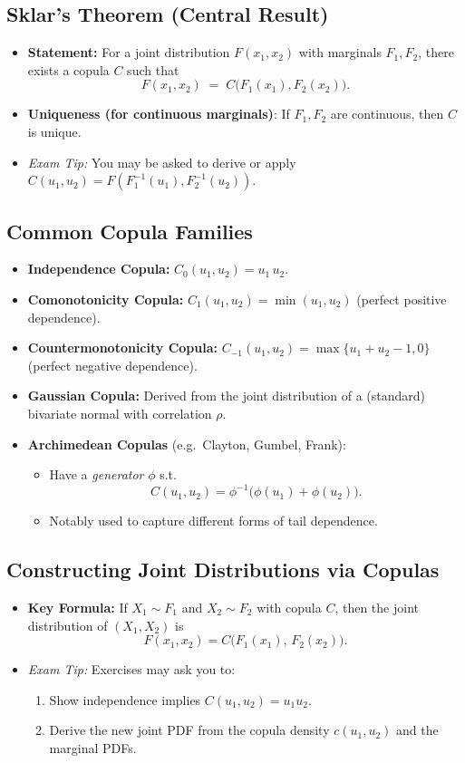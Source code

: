 \documentclass[13pt,a4paper]{article}
\begin{document}
\subsection{Sklar's Theorem (Central Result)}
\begin{itemize}
  \item \textbf{Statement:} For a joint distribution \(F(x_1,x_2)\) with marginals \(F_1,F_2\), there exists a copula \(C\) such that
  \[
    F(x_1,x_2) \;=\; C\bigl(F_1(x_1), F_2(x_2)\bigr).
  \]
  \item \textbf{Uniqueness (for continuous marginals)}: If \(F_1, F_2\) are continuous, then \(C\) is unique.
  \item \emph{Exam Tip:} You may be asked to derive or apply \(C(u_1,u_2)=F(F_1^{-1}(u_1),F_2^{-1}(u_2))\).  
\end{itemize}

\subsection{Common Copula Families}
\begin{itemize}
  \item \textbf{Independence Copula:} \(C_0(u_1,u_2)=u_1 \,u_2.\)
  \item \textbf{Comonotonicity Copula:} \(C_1(u_1,u_2)=\min(u_1,u_2)\) (perfect positive dependence).
  \item \textbf{Countermonotonicity Copula:} \(C_{-1}(u_1,u_2)=\max\{u_1+u_2-1,0\}\) (perfect negative dependence).
  \item \textbf{Gaussian Copula:} Derived from the joint distribution of a (standard) bivariate normal with correlation \(\rho\).
  \item \textbf{Archimedean Copulas} (e.g.\ Clayton, Gumbel, Frank): 
    \begin{itemize}
      \item Have a \emph{generator} \(\phi\) s.t.\ 
      \[
        C(u_1,u_2)=\phi^{-1}\bigl(\phi(u_1)+\phi(u_2)\bigr).
      \]
      \item Notably used to capture different forms of tail dependence.
    \end{itemize}
\end{itemize}

\subsection{Constructing Joint Distributions via Copulas}
\begin{itemize}
  \item \textbf{Key Formula:} If \(X_1\sim F_1\) and \(X_2\sim F_2\) with copula \(C\), then the joint distribution of \((X_1,X_2)\) is
  \[
    F(x_1,x_2) = C\bigl(F_1(x_1),\, F_2(x_2)\bigr).
  \]
  \item \emph{Exam Tip:} Exercises may ask you to:
    \begin{enumerate}
      \item Show independence implies \(C(u_1,u_2)=u_1u_2\).
      \item Derive the new joint PDF from the copula density \(c(u_1,u_2)\) and the marginal PDFs.
    \end{enumerate}
\end{itemize}
\end{document}
